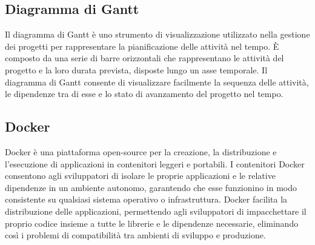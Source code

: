 \vspace{2em}
\subsection*{Diagramma di Gantt}
Il diagramma di Gantt è uno strumento di visualizzazione utilizzato nella gestione dei progetti per rappresentare la pianificazione delle attività nel tempo. È composto da una serie di barre orizzontali che rappresentano le attività del progetto e la loro durata prevista, disposte lungo un asse temporale. Il diagramma di Gantt consente di visualizzare facilmente la sequenza delle attività, le dipendenze tra di esse e lo stato di avanzamento del progetto nel tempo.

\vspace{2em}
\subsection*{Docker}
Docker è una piattaforma open-source per la creazione, la distribuzione e l'esecuzione di applicazioni in contenitori leggeri e portabili. I contenitori Docker consentono agli sviluppatori di isolare le proprie applicazioni e le relative dipendenze in un ambiente autonomo, garantendo che esse funzionino in modo consistente su qualsiasi sistema operativo o infrastruttura. Docker facilita la distribuzione delle applicazioni, permettendo agli sviluppatori di impacchettare il proprio codice insieme a tutte le librerie e le dipendenze necessarie, eliminando così i problemi di compatibilità tra ambienti di sviluppo e produzione.